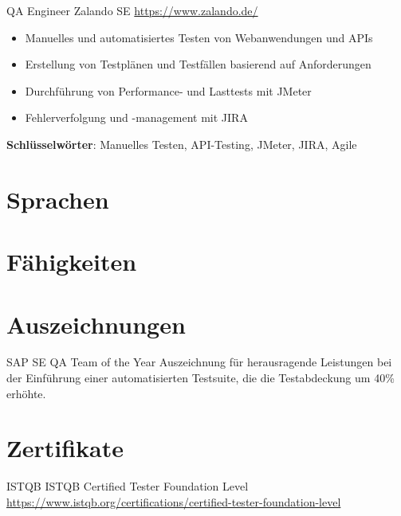 \documentclass[a4paper, serif, 10pt]{moderncv}
\begin{document}
        {QA Engineer}
        {Zalando SE}
        {\url{https://www.zalando.de/}}
        {}
        {\begin{itemize}
\item Manuelles und automatisiertes Testen von Webanwendungen und APIs
\item Erstellung von Testplänen und Testfällen basierend auf Anforderungen
\item Durchführung von Performance- und Lasttests mit JMeter
\item Fehlerverfolgung und -management mit JIRA
\end{itemize}
\textbf{Schlüsselwörter}: Manuelles Testen, API-Testing, JMeter, JIRA, Agile}
\section{Sprachen}

\section{Fähigkeiten}

\section{Auszeichnungen}

        {SAP SE}
        {QA Team of the Year}
        {}
        {}
        {Auszeichnung für herausragende Leistungen bei der Einführung einer automatisierten Testsuite, die die Testabdeckung um 40\% erhöhte.}
\section{Zertifikate}

        {ISTQB}
        {ISTQB Certified Tester Foundation Level}
        {\url{https://www.istqb.org/certifications/certified-tester-foundation-level}}
        {}
        {}
\end{document}
